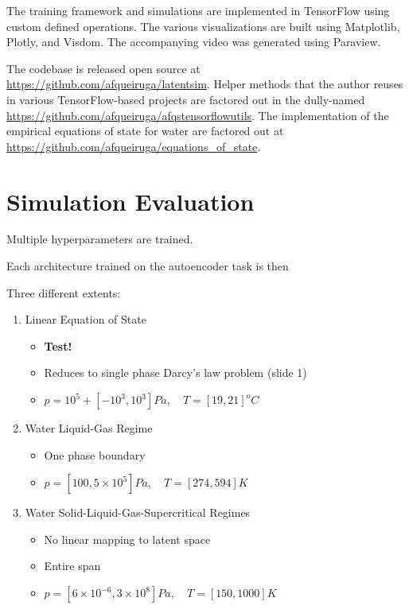 \documentclass[]{article}
\begin{document}
The training framework and simulations are implemented in TensorFlow 
using custom defined operations. The various visualizations are built
using Matplotlib, Plotly, and Visdom. The accompanying video was
generated using Paraview.

The codebase is released open source at
\url{https://github.com/afqueiruga/latentsim}. Helper methods that the
author reuses in various TensorFlow-based projects are factored out in
the dully-named \url{https://github.com/afqueiruga/afqstensorflowutils}.
The implementation of the empirical equations of state for water are
factored out at
\href{https://github.com/afqueiruga/equations_of_state}{https://github.com/afqueiruga/equations\_of\_state}.

\hypertarget{header-n3359}{%
\section{Simulation Evaluation}\label{header-n3359}}

Multiple hyperparameters are trained.

Each architecture trained on the autoencoder task is then

Three different extents:

\begin{enumerate}
\def\labelenumi{\arabic{enumi}.}
\item
  Linear Equation of State

  \begin{itemize}
  \item
    \textbf{Test!}
  \item
    Reduces to single phase Darcy's law problem (slide 1)
  \item
    \( p = 10^5+[-10^3, 10^3] Pa,\quad T = [ 19, 21 ] ^o C\)
  \end{itemize}
\item
  Water Liquid-Gas Regime

  \begin{itemize}
  \item
    One phase boundary 
  \item
    \( p = [100,5\times 10^5] Pa, \quad T = [274,594] K\)
  \end{itemize}
\item
  Water Solid-Liquid-Gas-Supercritical Regimes

  \begin{itemize}
  \item
    No linear mapping to latent space 
  \item
    Entire span
  \item
    \( p = [6\times 10^{-6},3\times 10^8]Pa, \quad T = [150,1000] K \)
  \end{itemize}
\end{enumerate}
\end{document}
